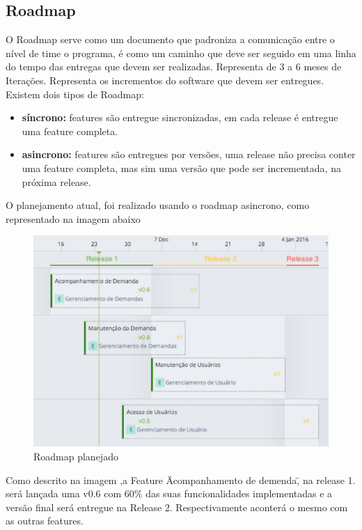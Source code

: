 \subsection{Roadmap}

O Roadmap serve como um documento que padroniza a comunicação entre o nível de time o programa,
é como um caminho que deve ser seguido em uma linha do tempo das entregas que devem ser realizadas.
Representa de 3 a 6 meses de Iterações. Representa os incrementos do software que devem ser entregues.
Existem dois tipos de Roadmap: \cite{scaleR}

\begin{itemize}
  \item \textbf{síncrono:} features são entregue sincronizadas, em cada release é entregue uma feature completa.
  \item \textbf{asincrono:} features são entregues por versões, uma release não precisa conter uma feature completa,
   mas sim uma versão que pode ser incrementada, na próxima release.
\end{itemize}

O planejamento atual, foi realizado usando o roadmap asincrono, como representado na imagem abaixo

\begin{figure}[H]
    \centering
	\includegraphics[keepaspectratio=true,scale=0.5]{figuras/roadmap.eps}
    \caption{Roadmap planejado}
    \label{fig:roadmap}
\end{figure}

Como descrito na imagem ,a Feature \"Acompanhamento de demenda\", na release 1.
será lançada uma v0.6 com 60\% das suas funcionalidades implementadas e a versão
final será entregue na Release 2. Respectivamente aconterá o mesmo com as outras features.

